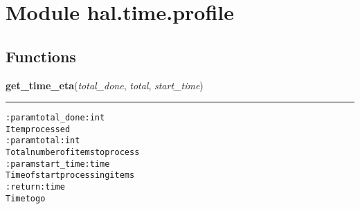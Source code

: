 %
%
%


\section{Module hal.time.profile}

    \label{hal:time:profile}


  \subsection{Functions}

    \label{hal:time:profile:get_time_eta}

    \vspace{0.5ex}

\hspace{.8\funcindent}\begin{boxedminipage}{\funcwidth}

    \raggedright \textbf{get\_time\_eta}(\textit{total\_done}, \textit{total}, \textit{start\_time})

    \vspace{-1.5ex}

    \rule{\textwidth}{0.5\fboxrule}
\setlength{\parskip}{2ex}
\begin{alltt}

:param total\_done: int
    Item processed
:param total: int
    Total number of items to process
:param start\_time: time
    Time of start processing items
:return: time
    Time to go
\end{alltt}

\setlength{\parskip}{1ex}
    \end{boxedminipage}

